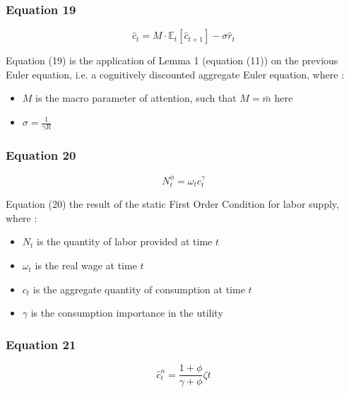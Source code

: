 \documentclass{article}
\begin{document}
\subsubsection*{Equation 19}
\begin{equation}
    \hat{c}_{t}=M\cdot\mathbb{E}_{t}\left[\hat{c}_{t+1}\right]-\sigma\hat{r}_{t}
\end{equation}

Equation (19) is the application of Lemma 1 (equation (11)) on the previous Euler equation, i.e. a cognitively discounted aggregate Euler equation, where : 
\begin{itemize}
    \item $M$ is the macro parameter of attention, such that $M=\bar{m}$ here
    \item $\sigma=\frac{1}{\gamma R}$
\end{itemize}

\subsubsection*{Equation 20}
\begin{equation}
    N^{\phi}_{t}=\omega_{t}c_{t}^{\gamma}
\end{equation}

Equation (20) the result of the static First Order Condition for labor supply, where : 
\begin{itemize}
    \item $N_{t}$ is the quantity of labor provided at time $t$
    \item $\omega_{t}$ is the real wage at time $t$
    \item $c_{t}$ is the aggregate quantity of consumption at time $t$
    \item $\gamma$ is the consumption importance in the utility
\end{itemize}

\subsubsection*{Equation 21}
\begin{equation}
    \hat{c}_{t}^{n}=\frac{1+\phi}{\gamma+\phi}\zeta{t}
\end{equation}
\end{document}
